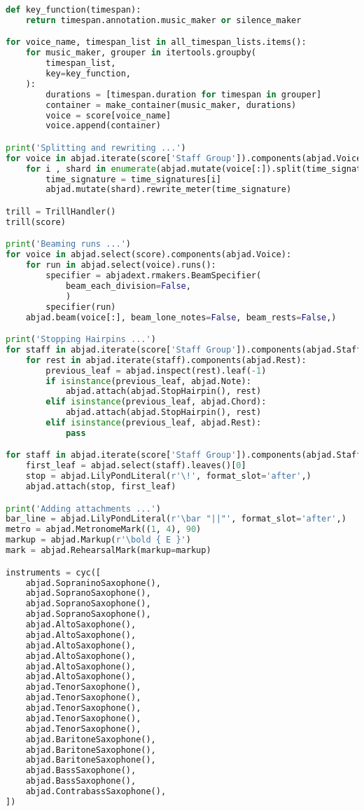 \begin{lstlisting}[language=Python, caption=Invocation Source Code]
def key_function(timespan):
    return timespan.annotation.music_maker or silence_maker

for voice_name, timespan_list in all_timespan_lists.items():
    for music_maker, grouper in itertools.groupby(
        timespan_list,
        key=key_function,
    ):
        durations = [timespan.duration for timespan in grouper]
        container = make_container(music_maker, durations)
        voice = score[voice_name]
        voice.append(container)

print('Splitting and rewriting ...')
for voice in abjad.iterate(score['Staff Group']).components(abjad.Voice):
    for i , shard in enumerate(abjad.mutate(voice[:]).split(time_signatures)):
        time_signature = time_signatures[i]
        abjad.mutate(shard).rewrite_meter(time_signature)

trill = TrillHandler()
trill(score)

print('Beaming runs ...')
for voice in abjad.select(score).components(abjad.Voice):
    for run in abjad.select(voice).runs():
        specifier = abjadext.rmakers.BeamSpecifier(
            beam_each_division=False,
            )
        specifier(run)
    abjad.beam(voice[:], beam_lone_notes=False, beam_rests=False,)

print('Stopping Hairpins ...')
for staff in abjad.iterate(score['Staff Group']).components(abjad.Staff):
    for rest in abjad.iterate(staff).components(abjad.Rest):
        previous_leaf = abjad.inspect(rest).leaf(-1)
        if isinstance(previous_leaf, abjad.Note):
            abjad.attach(abjad.StopHairpin(), rest)
        elif isinstance(previous_leaf, abjad.Chord):
            abjad.attach(abjad.StopHairpin(), rest)
        elif isinstance(previous_leaf, abjad.Rest):
            pass

for staff in abjad.iterate(score['Staff Group']).components(abjad.Staff):
    first_leaf = abjad.select(staff).leaves()[0]
    stop = abjad.LilyPondLiteral(r'\!', format_slot='after',)
    abjad.attach(stop, first_leaf)

print('Adding attachments ...')
bar_line = abjad.LilyPondLiteral(r'\bar "||"', format_slot='after',)
metro = abjad.MetronomeMark((1, 4), 90)
markup = abjad.Markup(r'\bold { E }')
mark = abjad.RehearsalMark(markup=markup)

instruments = cyc([
    abjad.SopraninoSaxophone(),
    abjad.SopranoSaxophone(),
    abjad.SopranoSaxophone(),
    abjad.SopranoSaxophone(),
    abjad.AltoSaxophone(),
    abjad.AltoSaxophone(),
    abjad.AltoSaxophone(),
    abjad.AltoSaxophone(),
    abjad.AltoSaxophone(),
    abjad.AltoSaxophone(),
    abjad.TenorSaxophone(),
    abjad.TenorSaxophone(),
    abjad.TenorSaxophone(),
    abjad.TenorSaxophone(),
    abjad.TenorSaxophone(),
    abjad.BaritoneSaxophone(),
    abjad.BaritoneSaxophone(),
    abjad.BaritoneSaxophone(),
    abjad.BassSaxophone(),
    abjad.BassSaxophone(),
    abjad.ContrabassSaxophone(),
])


\end{lstlisting}
